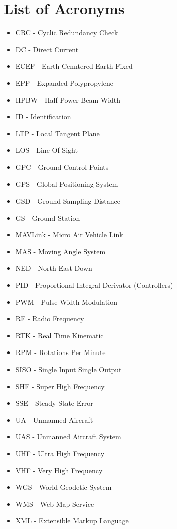 \section*{List of Acronyms}
\begin{itemize}
	\item CRC - Cyclic Redundancy Check
	\item DC - Direct Current
	\item ECEF - Earth-Cenntered Earth-Fixed
	\item EPP - Expanded Polypropylene
	\item HPBW - Half Power Beam Width
	\item ID - Identification
	\item LTP - Local Tangent Plane
	\item LOS - Line-Of-Sight
	\item GPC - Ground Control Points
	\item GPS - Global Positioning System
	\item GSD - Ground Sampling Distance
	\item GS - Ground Station
	\item MAVLink - Micro Air Vehicle Link
	\item MAS - Moving Angle System
	\item NED - North-East-Down
	\item PID - Proportional-Integral-Derivator (Controllers)
	\item PWM - Pulse Width Modulation
	\item RF - Radio Frequency
	\item RTK - Real Time Kinematic
	\item RPM - Rotations Per Minute
	\item SISO - Single Input Single Output
	\item SHF - Super High Frequency
	\item SSE - Steady State Error
	\item UA - Unmanned Aircraft
	\item UAS - Unmanned Aircraft System
	\item UHF - Ultra High Frequency
	\item VHF - Very High Frequency
	\item WGS - World Geodetic System
	\item WMS - Web Map Service
	\item XML - Extensible Markup Language
\end{itemize}